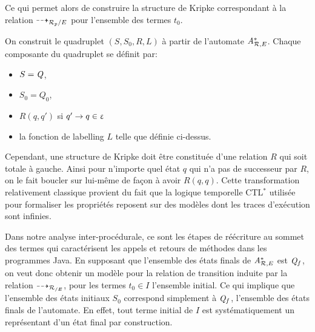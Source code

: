 Ce qui permet alors de construire la structure de Kripke correspondant à la relation $\dashrightarrow_{\mathcal R_p/E}$ pour l'ensemble des termes $t_0$.

\begin{definition}%
  On construit le quadruplet $(S, S_0, R, L)$ à partir de l'automate ${\mathit A}_{\mathcal R,E}^*$.
  Chaque composante du quadruplet se définit par:
  \begin{itemize}
  \item $S = \mathit Q$, 
  \item $S_0 = Q_0$,
  \item $R(q, q')$ si $q' \rightarrow q \in \upvarepsilon$
  \item la fonction de labelling $L$ telle que définie ci-dessus.
  \end{itemize}
\end{definition}

Cependant, une structure de Kripke doit être constituée d'une relation $R$ qui soit totale à gauche.
Ainsi pour n'importe quel état $q$ qui n'a pas de successeur par $R$, on le fait boucler sur lui-même
de façon à avoir $R(q, q)$. Cette transformation relativement classique provient du fait que
la logique temporelle CTL$^*$ utilisée pour formaliser les propriétés reposent sur des modèles dont les traces
d'exécution sont infinies.

Dans notre analyse inter-procédurale, ce sont les étapes de réécriture au sommet des termes qui caractérisent
les appels et retours de méthodes dans les programmes Java. En supposant que l'ensemble des états finals de ${\mathit A}_{\mathcal R,E}^*$ est $\mathit Q_f$,
on veut donc obtenir un modèle pour la relation de transition induite par la relation $\dashrightarrow_{\mathcal R_{/E}}$, pour les termes $t_0 \in I$ l'ensemble initial. Ce qui implique
que l'ensemble des états initiaux $S_0$ correspond simplement à $\mathit Q_f$, l'ensemble des états finals de 
l'automate. En effet, tout terme initial de $I$ est systématiquement un représentant d'un état final par construction.

 
